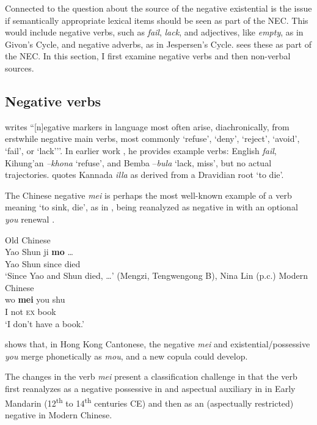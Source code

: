 ﻿\documentclass[output=paper]{langsci/langscibook}
\begin{document}
Connected to the question about the source of the negative existential is
the issue if semantically appropriate lexical items should be seen as part
of the NEC. This would include negative verbs, such as \textit{fail},
\textit{lack}, and adjectives, like \textit{empty}, as in Givon's Cycle,
and negative adverbs, as in Jespersen's Cycle.
\citet[136--7]{Veselinova2013} sees these as part of the NEC. In this
section, I first examine negative verbs and then non-verbal sources.

\subsection{Negative verbs}\label{sec:oth-3.1}

\citet[89]{Givon1978} writes ``[n]egative markers in language most often
arise, diachronically, from erstwhile negative main verbs, most commonly
`refuse', `deny', `reject', `avoid', `fail', or `lack{'}''. In earlier work
\citep[917]{Givon1973}, he provides example verbs: English \textit{fail},
Kihung'an \textit{–khona} `refuse', and Bemba –\textit{bula} `lack, miss',
but no actual trajectories. \citet{Veselinova2013} quotes Kannada
\textit{illa} as derived from a Dravidian root `to die'. 

The Chinese negative \textit{mei} is perhaps the most well-known example of
a verb meaning `to sink, die', as in , being
reanalyzed as negative in  with an optional
\textit{you} renewal
\parencites[11]{Croft1991}{ShiLi2004}{Yang2012}.
%
\begin{exe}\ex Old Chinese \label{ex:other-chinese-die}\\
    \gll Yao  Shun  ji  \textbf{mo}   \ldots{}          \\
  Yao   Shun   since   died \\
    \glt `Since Yao and Shun died, \ldots' (Mengzi, Tengwengong B), Nina Lin (p.c.)
    \ex Modern Chinese \label{ex:other-chinese-book}\\
    \gll wo  \textbf{mei}  {\op}you{\cp}  shu            \\
  I  not  \textsc{ex}  book \\
    \glt `I don't have a book.'
    \end{exe}
%
\citet{LamChitYu2017} shows that, in Hong Kong Cantonese, the negative
\textit{mei} and existential\slash possessive \textit{you} merge
phonetically as \textit{mou}, and a new copula could develop.

The changes in the verb \textit{mei} present a classification challenge in
that the verb first reanalyzes as a negative possessive in
and aspectual auxiliary in  in Early Mandarin
(12\textsuperscript{th} to 14\textsuperscript{th} centuries CE) and then as
an (aspectually restricted) negative in Modern Chinese. 
\end{document}
